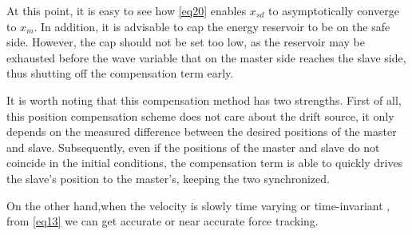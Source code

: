 At this point,
it is easy to see how \eqref{eq20} enables $x_{sd}$ to asymptotically converge to $x_m$.
In addition, it is advisable to cap the energy reservoir to be on the safe side.
However, the cap should not be set too low,
as the reservoir may be exhausted 
before the wave variable that on the master side reaches the slave side,
thus shutting off the compensation term early.
\par It is worth noting that this compensation method has two strengths.
First of all, this position compensation scheme does not care about the drift source,
it only depends on the measured difference between the desired positions of the master and slave.
Subsequently, 
even if the positions of the master and slave 
do not coincide in the initial conditions,
the compensation term is able to quickly drives the slave's position to the master's, 
keeping the two synchronized.
\par On the other hand,when the velocity is slowly time varying  or time-invariant ,
from \eqref{eq13} we can get accurate or near accurate force tracking.







